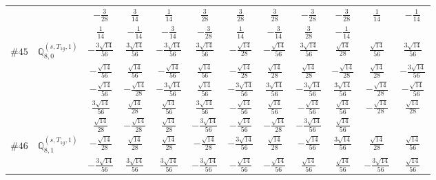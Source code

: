 \documentclass[fleqn,9pt,landscape]{jsarticle}
\begin{document}
\begin{center}
\begin{longtable}{lcccccccccc}
& $ - \frac{3}{28} $ & $ \frac{3}{14} $ & $ \frac{1}{14} $ & $ \frac{3}{28} $ & $ \frac{3}{28} $ & $ \frac{3}{28} $ & $ - \frac{3}{28} $ & $ - \frac{3}{28} $ & $ \frac{1}{14} $ & $ - \frac{1}{14} $ \\
& $ \frac{1}{14} $ & $ - \frac{1}{14} $ & $ - \frac{3}{14} $ & $ - \frac{3}{28} $ & $ \frac{1}{14} $ & $ - \frac{3}{14} $ & $ \frac{3}{28} $ & $ - \frac{1}{14} $ & $  $ & $  $ \\ \hline
$ \#45\quad \mathbb{Q}_{8,0}^{(s,T_{1g},1)} $ & $ - \frac{3 \sqrt{14}}{56} $ & $ \frac{3 \sqrt{14}}{56} $ & $ - \frac{3 \sqrt{14}}{56} $ & $ \frac{3 \sqrt{14}}{56} $ & $ - \frac{\sqrt{14}}{28} $ & $ - \frac{\sqrt{14}}{56} $ & $ \frac{3 \sqrt{14}}{56} $ & $ \frac{\sqrt{14}}{28} $ & $ \frac{\sqrt{14}}{56} $ & $ \frac{3 \sqrt{14}}{56} $ \\
& $ - \frac{\sqrt{14}}{56} $ & $ \frac{\sqrt{14}}{56} $ & $ - \frac{\sqrt{14}}{56} $ & $ \frac{\sqrt{14}}{56} $ & $ - \frac{\sqrt{14}}{28} $ & $ \frac{\sqrt{14}}{28} $ & $ \frac{\sqrt{14}}{28} $ & $ - \frac{\sqrt{14}}{28} $ & $ \frac{\sqrt{14}}{28} $ & $ - \frac{3 \sqrt{14}}{56} $ \\
& $ - \frac{\sqrt{14}}{56} $ & $ - \frac{\sqrt{14}}{28} $ & $ - \frac{3 \sqrt{14}}{56} $ & $ \frac{\sqrt{14}}{56} $ & $ - \frac{3 \sqrt{14}}{56} $ & $ \frac{3 \sqrt{14}}{56} $ & $ - \frac{3 \sqrt{14}}{56} $ & $ \frac{3 \sqrt{14}}{56} $ & $ - \frac{\sqrt{14}}{28} $ & $ - \frac{\sqrt{14}}{56} $ \\
& $ \frac{3 \sqrt{14}}{56} $ & $ \frac{\sqrt{14}}{28} $ & $ \frac{\sqrt{14}}{56} $ & $ \frac{3 \sqrt{14}}{56} $ & $ - \frac{\sqrt{14}}{56} $ & $ \frac{\sqrt{14}}{56} $ & $ - \frac{\sqrt{14}}{56} $ & $ \frac{\sqrt{14}}{56} $ & $ - \frac{\sqrt{14}}{28} $ & $ \frac{\sqrt{14}}{28} $ \\
& $ \frac{\sqrt{14}}{28} $ & $ - \frac{\sqrt{14}}{28} $ & $ \frac{\sqrt{14}}{28} $ & $ - \frac{3 \sqrt{14}}{56} $ & $ - \frac{\sqrt{14}}{56} $ & $ - \frac{\sqrt{14}}{28} $ & $ - \frac{3 \sqrt{14}}{56} $ & $ \frac{\sqrt{14}}{56} $ & $  $ & $  $ \\ \hline
$ \#46\quad \mathbb{Q}_{8,1}^{(s,T_{1g},1)} $ & $ - \frac{\sqrt{14}}{28} $ & $ \frac{\sqrt{14}}{28} $ & $ \frac{\sqrt{14}}{28} $ & $ - \frac{\sqrt{14}}{28} $ & $ - \frac{3 \sqrt{14}}{56} $ & $ \frac{\sqrt{14}}{28} $ & $ - \frac{\sqrt{14}}{56} $ & $ \frac{3 \sqrt{14}}{56} $ & $ \frac{\sqrt{14}}{28} $ & $ \frac{\sqrt{14}}{56} $ \\
& $ - \frac{3 \sqrt{14}}{56} $ & $ \frac{3 \sqrt{14}}{56} $ & $ \frac{3 \sqrt{14}}{56} $ & $ - \frac{3 \sqrt{14}}{56} $ & $ - \frac{\sqrt{14}}{56} $ & $ - \frac{\sqrt{14}}{56} $ & $ \frac{\sqrt{14}}{56} $ & $ \frac{\sqrt{14}}{56} $ & $ - \frac{3 \sqrt{14}}{56} $ & $ \frac{\sqrt{14}}{56} $ \\

\end{longtable}
\end{center}
\end{document}
